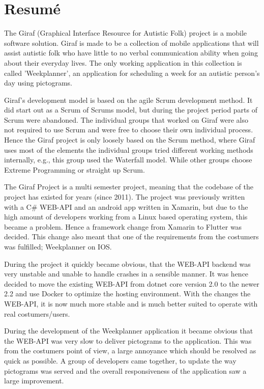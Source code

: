 \chapter*{Resumé}
The Giraf (Graphical Interface Resource for Autistic Folk) project is a mobile software solution.
Giraf is made to be a collection of mobile applications that will assist autistic folk who have little to no verbal communication ability when going about their everyday lives.
The only working application in this collection is called 'Weekplanner', an application for scheduling a week for an autistic person's day using pictograms.

Giraf's development model is based on the agile Scrum development method.
It did start out as a Scrum of Scrums model, but during the project period parts of Scrum were abandoned.
The individual groups that worked on Giraf were also not required to use Scrum and were free to choose their own individual process.
Hence the Giraf project is only loosely based on the Scrum method, where Giraf uses most of the elements the individual groups tried different working methods internally, e.g., this group used the Waterfall model.
While other groups choose Extreme Programming or straight up Scrum. 

The Giraf Project is a multi semester project, meaning that the codebase of the project has existed for years (since 2011). 
The project was previously written with a C\# WEB-API and an android app written in Xamarin, but due to the high amount of developers working from a Linux based operating system, this became a problem. 
Hence a framework change from Xamarin to Flutter was decided. 
This change also meant that one of the requirements from the costumers was fulfilled; Weekplanner on IOS.

During the project it quickly became obvious, that the WEB-API backend was very unstable and unable to handle crashes in a sensible manner. 
It was hence decided to move the existing WEB-API from dotnet core version 2.0 to the newer 2.2 and use Docker to optimize the hosting environment. 
With the changes the WEB-API, it is now much more stable and is much better suited to operate with real costumers/users.

During the development of the Weekplanner application it became obvious that the WEB-API was very slow to deliver pictograms to the application. 
This was from the costumers point of view, a large annoyance which should be resolved as quick as possible. 
A group of developers came together, to update the way pictograms was served and the overall responsiveness of the application saw a large improvement.

